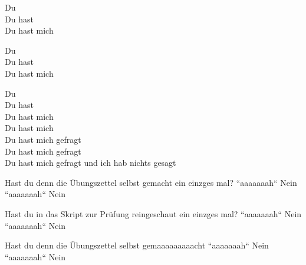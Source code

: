 \begin{verseplay}[10em]
\s{\Sing} Du\\
Du hast\\
Du hast mich\\
\end{verseplay}
\begin{verseplay}[10em]
\s{\Sing} Du\\
Du hast\\
Du hast mich\\
\end{verseplay}
\begin{verseplay}[10em]
\s{\Sing} Du\\
Du hast\\
Du hast mich\\
Du hast mich\\
Du hast mich gefragt\\
Du hast mich gefragt\\
Du hast mich gefragt und ich hab nichts gesagt\\
\end{verseplay}
\begin{verseplay}[10em]
\s{\Sing}Hast du denn die Übungszettel selbst gemacht ein einzges mal?
\s{\Chor}``aaaaaaah`` \s{\Sing} Nein\\
\s{\Chor}``aaaaaaah`` \s{\Sing} Nein\\
\end{verseplay}
\begin{verseplay}[10em]
\s{\Sing}Hast du in das Skript zur Prüfung reingeschaut ein einzges mal?
\s{\Chor}``aaaaaaah`` \s{\Sing} Nein\\
\s{\Chor}``aaaaaaah`` \s{\Sing} Nein\\
\end{verseplay}
\begin{verseplay}[10em]
\s{\Sing}Hast du denn die Übungszettel selbst gemaaaaaaaaacht
\s{\Chor}``aaaaaaah`` \s{\Sing} Nein\\
\s{\Chor}``aaaaaaah`` \s{\Sing} Nein\\

\end{verseplay}

